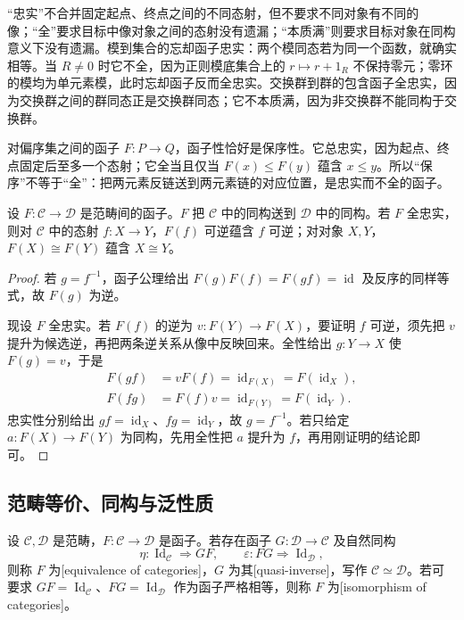 “忠实”不合并固定起点、终点之间的不同态射，但不要求不同对象有不同的像；“全”要求目标中像对象之间的态射没有遗漏；“本质满”则要求目标对象在同构意义下没有遗漏。模到集合的忘却函子忠实：两个模同态若为同一个函数，就确实相等。当 \(R\ne0\) 时它不全，因为正则模底集合上的 \(r\mapsto r+1_R\) 不保持零元；零环的模均为单元素模，此时忘却函子反而全忠实。交换群到群的包含函子全忠实，因为交换群之间的群同态正是交换群同态；它不本质满，因为非交换群不能同构于交换群。

\ProseParagraphBreak
对偏序集之间的函子 \(F:P\rightarrow Q\)，函子性恰好是保序性。它总忠实，因为起点、终点固定后至多一个态射；它全当且仅当 \(F(x)\le F(y)\) 蕴含 \(x\le y\)。所以“保序”不等于“全”：把两元素反链送到两元素链的对应位置，是忠实而不全的函子。

\begin{proposition}\label{b2:prop:fully-faithful-reflects-isomorphism}
	设 \(F:\mathcal C\to\mathcal D\) 是范畴间的函子。\(F\) 把 \(\mathcal C\) 中的同构送到 \(\mathcal D\) 中的同构。若 \(F\) 全忠实，则对 \(\mathcal C\) 中的态射 \(f:X\to Y\)，\(F(f)\) 可逆蕴含 \(f\) 可逆；对对象 \(X,Y\)，\(F(X)\cong F(Y)\) 蕴含 \(X\cong Y\)。
\end{proposition}
\begin{proof}
	若 \(g=f^{-1}\)，函子公理给出 \(F(g)F(f)=F(gf)=\operatorname{id}\) 及反序的同样等式，故 \(F(g)\) 为逆。

	现设 \(F\) 全忠实。若 \(F(f)\) 的逆为 \(v:F(Y)\rightarrow F(X)\)，要证明 \(f\) 可逆，须先把 \(v\) 提升为候选逆，再把两条逆关系从像中反映回来。全性给出 \(g:Y\rightarrow X\) 使 \(F(g)=v\)，于是
	\[
		\begin{aligned}
			F(gf)&=vF(f)=\operatorname{id}_{F(X)}=F(\operatorname{id}_X),\\
			F(fg)&=F(f)v=\operatorname{id}_{F(Y)}=F(\operatorname{id}_Y).
		\end{aligned}
	\]
	忠实性分别给出 \(gf=\operatorname{id}_X\)、\(fg=\operatorname{id}_Y\)，故 \(g=f^{-1}\)。若只给定 \(a:F(X)\rightarrow F(Y)\) 为同构，先用全性把 \(a\) 提升为 \(f\)，再用刚证明的结论即可。
\end{proof}

\subsection{范畴等价、同构与泛性质}
\label{b2:subsec:0504:02}

\begin{definition}\label{b2:def:category-equivalence}
	设 \(\mathcal C,\mathcal D\) 是范畴，\(F:\mathcal C\rightarrow\mathcal D\) 是函子。若存在函子 \(G:\mathcal D\rightarrow\mathcal C\) 及自然同构
	\[
		\eta:\operatorname{Id}_{\mathcal C}\Rightarrow GF,\qquad \varepsilon:FG\Rightarrow\operatorname{Id}_{\mathcal D},
	\]
	则称 \(F\) 为[equivalence of categories]，\(G\) 为其[quasi-inverse]，写作 \(\mathcal C\simeq\mathcal D\)。若可要求 \(GF=\operatorname{Id}_{\mathcal C}\)、\(FG=\operatorname{Id}_{\mathcal D}\) 作为函子严格相等，则称 \(F\) 为[isomorphism of categories]。
\end{definition}

